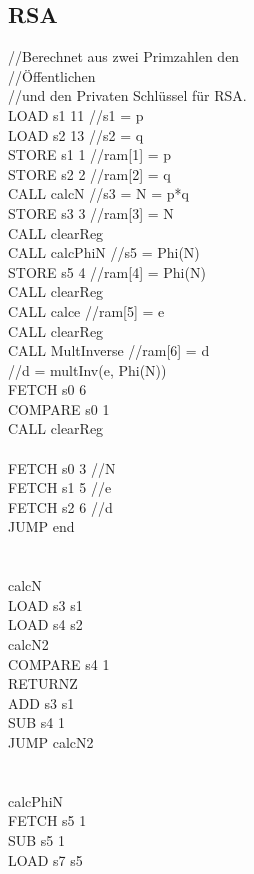 \documentclass{scrartcl}
\begin{document}
\subsection{RSA}
\begin{multicols*}{2}
//Berechnet aus zwei Primzahlen den\\
//Öffentlichen\\
//und den Privaten Schlüssel für RSA.\\
LOAD s1 11 //s1 = p\\
LOAD s2 13 //s2 = q\\
STORE s1 1 //ram[1] = p\\
STORE s2 2 //ram[2] = q\\
CALL calcN //s3 = N = p*q\\
STORE s3 3 //ram[3] = N\\
CALL clearReg\\
CALL calcPhiN //s5 = Phi(N)\\
STORE s5 4 //ram[4] = Phi(N)\\
CALL clearReg\\
CALL calce //ram[5] = e\\
CALL clearReg\\
CALL MultInverse //ram[6] = d\\
//d = multInv(e, Phi(N))\\
FETCH s0 6\\
COMPARE s0 1\\
CALL clearReg\\
\\
FETCH s0 3 //N\\
FETCH s1 5 //e\\
FETCH s2 6 //d\\
JUMP end\\
\\
\\
calcN\\
LOAD s3 s1\\
LOAD s4 s2\\
calcN2\\
COMPARE s4 1\\
RETURNZ\\
ADD s3 s1\\
SUB s4 1\\
JUMP calcN2\\
\\
\\
calcPhiN\\
FETCH s5 1\\
SUB s5 1\\
LOAD s7 s5\\

\end{multicols*}
\end{document}

